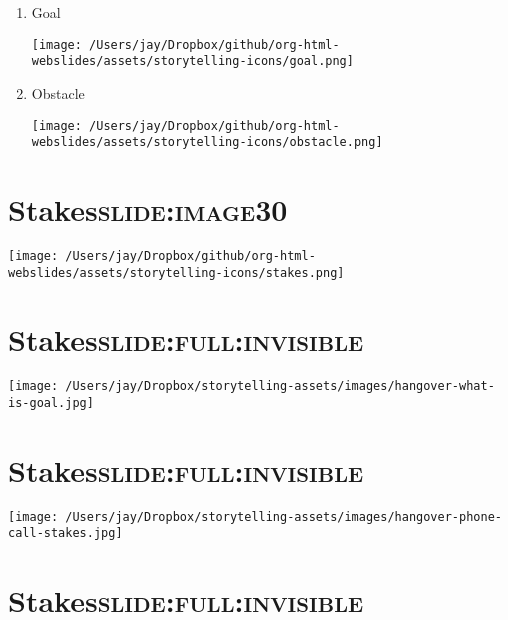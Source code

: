 \documentclass[12pt]{article}
\begin{document}
\begin{enumerate}
\item Goal \begin{center}
\texttt{[image: /Users/jay/Dropbox/github/org-html-webslides/assets/storytelling-icons/goal.png]}
\end{center}
\item Obstacle \begin{center}
\texttt{[image: /Users/jay/Dropbox/github/org-html-webslides/assets/storytelling-icons/obstacle.png]}
\end{center}
\end{enumerate}



\section[Stakes]{Stakes\hfill{}\textsc{slide:image30}}
\label{sec:org9b5b73a}

\begin{center}
\texttt{[image: /Users/jay/Dropbox/github/org-html-webslides/assets/storytelling-icons/stakes.png]}
\end{center}

\section[Stakes]{Stakes\hfill{}\textsc{slide:full:invisible}}
\label{sec:org6c327de}

\begin{center}
\texttt{[image: /Users/jay/Dropbox/storytelling-assets/images/hangover-what-is-goal.jpg]}
\end{center}


\section[Stakes]{Stakes\hfill{}\textsc{slide:full:invisible}}
\label{sec:org43b36e2}

\begin{center}
\texttt{[image: /Users/jay/Dropbox/storytelling-assets/images/hangover-phone-call-stakes.jpg]}
\end{center}

\section[Stakes]{Stakes\hfill{}\textsc{slide:full:invisible}}
\label{sec:org81de412}
\end{document}
